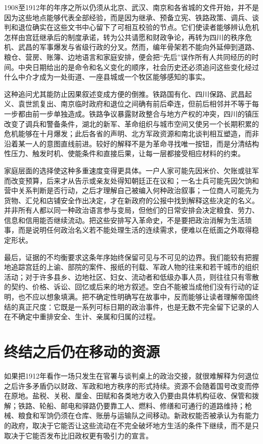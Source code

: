 1908至1912年的年序之所以仍须从北京、武汉、南京和各省城的文件开始，并不是因为这些地点能够代表全部经验，而是因为继承、预备立宪、铁路政策、调兵、谈判和退位确实在这些文书中心留下了可相互校验的节点。它们使读者能够辨认危机怎样由宫廷继承后的制度承诺，转为公共请愿和财政争论，再转为四川的秩序危机、武昌的军事爆发与省级行政的分叉。然而，编年骨架若不能向外延伸到道路、粮仓、营房、账簿、边地语言和家庭安排，便会把“先后”误作所有人共同经历的时间。中央日期给出的是命令和名义变化的顺序，社会历史还必须追问这些变化经过什么中介才成为一处街道、一座县城或一个牧区能够感知的事实。

这种追问尤其能防止因果叙述变成方便的倒推。铁路国有化、四川保路、武昌起义、袁世凯复出、南京临时政府和退位之间确有前后牵连，但前后相邻并不等于每一步都由前一步单独造成。铁路争议暴露财政整合与地方产权的冲突，四川的镇压改变了调兵和警备条件，湖北的新军、革命组织与城市空间又使另一个长期积累的危机能够在十月爆发；此后各省的声明、北方军政资源和南北谈判相互塑造，而非沿着某一人的意图直线前进。较好的解释不是为革命寻找唯一按钮，而是分清结构性压力、触发时机、使能条件和直接后果，让每一层都接受相应材料的约束。

家庭层面的选择使这种多重速度变得更具体。一户人家可能先因米价、欠账或驻军而改变预算，后来才从告示或亲友处得知朝廷正在议和；一名士兵可能先因欠饷和营中关系判断是否行动，之后才理解自己被编入何种政治叙事；一位商人可能先为货物、汇兑和店铺安全作出决定，才在新政府的公报中找到解释这些决定的名义。并非所有人都以同一种政治语言参与变局，但他们的日常安排会决定粮食、劳力、信息和信用能否继续流动。把这些安排写入革命史，不是要把政治消解为生活琐事，而是说明任何政治名义若不能处理生活的连续需求，便难以在纸面之外取得稳定形状。

最后，证据的不均衡要求这条年序始终保留可见与不可见的边界。我们能较有把握地追踪宫廷的上谕、部院的案件、报纸的刊载、军政人物的往来和若干城市的组织活动；对于许多县乡、边地社区、妇女、流动者和低级办事人员，则往往只有零散的契约、价格、诉讼、回忆或后来的地方叙述。空白不能被当成他们没有行动的证明，也不应以想象填满。把不确定性明确写在故事中，反而能够让读者理解帝国终结的真正尺度：它既是一系列可标日期的政治事件，也是无数不完全留下记录的人在不确定中重排安全、生计、亲属和归属的过程。

\section{终结之后仍在移动的资源}

如果把1912年看作一场只发生在官署与谈判桌上的政治交接，就很难解释为何退位之后许多矛盾仍以财政、军政和地方秩序的形式持续。资源不会随着国号改变而停在原地。盐税、关税、厘金、田赋和各类地方收入仍要由具体机构征收、保管和拨解；铁路、轮船、邮电和驿路仍要靠工人、燃料、修缮和可通行的道路维持；枪械、粮食和军饷仍须在仓库、账册与运输队之间移动。新政权能否被承认为有能力的政府，取决于它能否让这些流动在不完全破坏地方生活的条件下继续，而不是只取决于它能否发布比旧政权更有吸引力的宣言。

